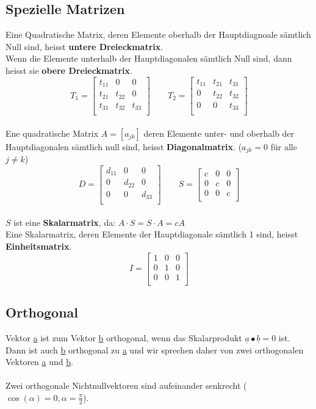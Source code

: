 \subsection*{Spezielle Matrizen}
Eine Quadratische Matrix, deren Elemente oberhalb der Hauptdiagnoale sämtlich Null sind,
heisst \textbf{untere Dreieckmatrix}.\\
Wenn die Elemente unterhalb der Hauptdiagonalen sämtlich Null sind, dann heisst sie \textbf{obere Dreieckmatrix}.
\[
	T_1 =
	\begin{bmatrix}
		t_{11} & 0 		& 0 \\
		t_{21} & t_{22} & 0 \\
		t_{31} & t_{32} & t_{33} \\
	\end{bmatrix} \qquad
	T_2 =
	\begin{bmatrix}
		t_{11} & t_{21} & t_{31} \\
		0	   & t_{22} & t_{32} \\
		0	   & 0      & t_{33} \\
	\end{bmatrix}
\]
\\
Ene quadratische Matrix $A=[a_{jk}]$ deren Elemente unter- und oberhalb der Hauptdiagonalen sämtlich null sind, heisst \textbf{Diagonalmatrix}. ($a_{jk} = 0$ für alle $j \neq k$)
\[
	D = 
	\begin{bmatrix}
		d_{11} & 0      & 0\\
		0	   & d_{22} & 0 \\
		0	   & 0      & d_{33} \\
	\end{bmatrix} \qquad
	S =
	\begin{bmatrix}
		c & 0 & 0\\
		0 & c & 0 \\
		0 & 0 & c \\
	\end{bmatrix}
\]
\\
$S$ ist eine \textbf{Skalarmatrix}, da: $A \cdot S = S \cdot A = cA$\\
Eine Skalarmatrix, deren Elemente der Hauptdiagonale sämtlich 1 sind, heisst \textbf{Einheitsmatrix}.
\[
	I =
	\begin{bmatrix}
		1 & 0 & 0\\
		0 & 1 & 0 \\
		0 & 0 & 1 \\
	\end{bmatrix}
\]

\subsection*{Orthogonal}
Vektor \underline{a} ist zum Vektor \underline{b} orthogonal, wenn das Skalarprodukt $\underline{a}\bullet\underline{b}=0$ ist. Dann ist auch \underline{b} orthogonal zu \underline{a} und wir sprechen daher von zwei orthogonalen Vektoren \underline{a} und \underline{b}.\\
\\
Zwei orthogonale Nichtnullvektoren sind aufeinander senkrecht ($\cos(\alpha)=0,\alpha=\frac{\pi}{2}$).

